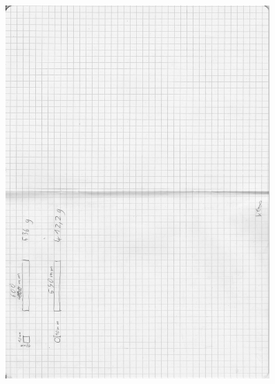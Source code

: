 \begin{figure}
    \centering
    \includegraphics[width=0.9\textwidth]{assets/messdaten3.pdf}
\end{figure}